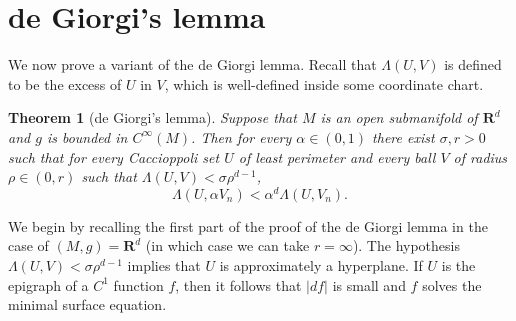 \documentclass[reqno,12pt,letterpaper]{amsart}
\newcommand{\RR}{\mathbf{R}}
\newtheorem{theorem}{Theorem}[section]
\newtheorem{corollary}[theorem]{Corollary}
\theoremstyle{definition}
\numberwithin{equation}{section}
\begin{document}
%
%






\section{de Giorgi's lemma}
We now prove a variant of the de Giorgi lemma. Recall that $\Lambda(U, V)$ is defined to be the excess of $U$ in $V$, which is well-defined inside some coordinate chart.

\begin{theorem}[de Giorgi's lemma]\label{DGL}
Suppose that $M$ is an open submanifold of $\RR^d$ and $g$ is bounded in $C^\infty(M)$.
Then for every $\alpha \in (0, 1)$ there exist $\sigma, r > 0$ such that for every Caccioppoli set $U$ of least perimeter and every ball $V$ of radius $\rho \in (0, r)$ such that $\Lambda(U, V) < \sigma \rho^{d - 1}$,
$$\Lambda(U, \alpha V_n) < \alpha^d \Lambda(U, V_n).$$
\end{theorem}

We begin by recalling the first part of the proof of the de Giorgi lemma in the case of $(M, g) = \RR^d$ (in which case we can take $r = \infty$).
The hypothesis $\Lambda(U, V) < \sigma \rho^{d - 1}$ implies that $U$ is approximately a hyperplane.
If $U$ is the epigraph of a $C^1$ function $f$, then it follows that $|df|$ is small and $f$ solves the minimal surface equation.
\end{document}
